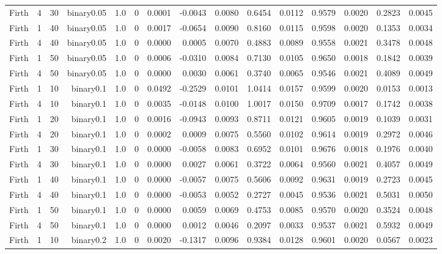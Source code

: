 \begin{longtable}{rrrrrrrrrrrrrrr}
  Firth & 4 & 30 & binary0.05 & 1.0 & 0 & 0.0001 & -0.0043 & 0.0080 & 0.6454 & 0.0112 & 0.9579 & 0.0020 & 0.2823 & 0.0045 \\ 
  Firth & 1 & 40 & binary0.05 & 1.0 & 0 & 0.0017 & -0.0654 & 0.0090 & 0.8160 & 0.0115 & 0.9598 & 0.0020 & 0.1353 & 0.0034 \\ 
  Firth & 4 & 40 & binary0.05 & 1.0 & 0 & 0.0000 & 0.0005 & 0.0070 & 0.4883 & 0.0089 & 0.9558 & 0.0021 & 0.3478 & 0.0048 \\ 
  Firth & 1 & 50 & binary0.05 & 1.0 & 0 & 0.0006 & -0.0310 & 0.0084 & 0.7130 & 0.0105 & 0.9650 & 0.0018 & 0.1842 & 0.0039 \\ 
  Firth & 4 & 50 & binary0.05 & 1.0 & 0 & 0.0000 & 0.0030 & 0.0061 & 0.3740 & 0.0065 & 0.9546 & 0.0021 & 0.4089 & 0.0049 \\ 
  Firth & 1 & 10 & binary0.1 & 1.0 & 0 & 0.0492 & -0.2529 & 0.0101 & 1.0414 & 0.0157 & 0.9599 & 0.0020 & 0.0153 & 0.0013 \\ 
  Firth & 4 & 10 & binary0.1 & 1.0 & 0 & 0.0035 & -0.0148 & 0.0100 & 1.0017 & 0.0150 & 0.9709 & 0.0017 & 0.1742 & 0.0038 \\ 
  Firth & 1 & 20 & binary0.1 & 1.0 & 0 & 0.0016 & -0.0943 & 0.0093 & 0.8711 & 0.0121 & 0.9605 & 0.0019 & 0.1039 & 0.0031 \\ 
  Firth & 4 & 20 & binary0.1 & 1.0 & 0 & 0.0002 & 0.0009 & 0.0075 & 0.5560 & 0.0102 & 0.9614 & 0.0019 & 0.2972 & 0.0046 \\ 
  Firth & 1 & 30 & binary0.1 & 1.0 & 0 & 0.0000 & -0.0058 & 0.0083 & 0.6952 & 0.0101 & 0.9676 & 0.0018 & 0.1976 & 0.0040 \\ 
  Firth & 4 & 30 & binary0.1 & 1.0 & 0 & 0.0000 & 0.0027 & 0.0061 & 0.3722 & 0.0064 & 0.9560 & 0.0021 & 0.4057 & 0.0049 \\ 
  Firth & 1 & 40 & binary0.1 & 1.0 & 0 & 0.0000 & -0.0057 & 0.0075 & 0.5606 & 0.0092 & 0.9631 & 0.0019 & 0.2723 & 0.0045 \\ 
  Firth & 4 & 40 & binary0.1 & 1.0 & 0 & 0.0000 & -0.0053 & 0.0052 & 0.2727 & 0.0045 & 0.9536 & 0.0021 & 0.5031 & 0.0050 \\ 
  Firth & 1 & 50 & binary0.1 & 1.0 & 0 & 0.0000 & 0.0059 & 0.0069 & 0.4753 & 0.0085 & 0.9570 & 0.0020 & 0.3524 & 0.0048 \\ 
  Firth & 4 & 50 & binary0.1 & 1.0 & 0 & 0.0000 & 0.0012 & 0.0046 & 0.2097 & 0.0033 & 0.9537 & 0.0021 & 0.5932 & 0.0049 \\ 
  Firth & 1 & 10 & binary0.2 & 1.0 & 0 & 0.0020 & -0.1317 & 0.0096 & 0.9384 & 0.0128 & 0.9601 & 0.0020 & 0.0567 & 0.0023 \\ 

\end{longtable}
